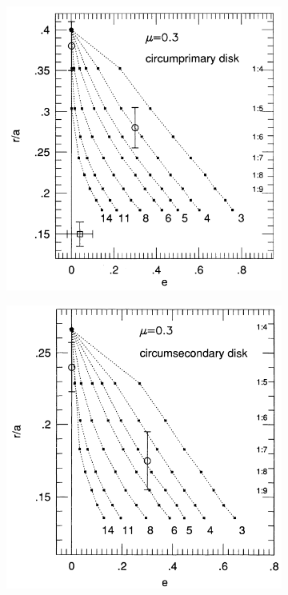 \begin{figure}[h]
    \centering
    
    \begin{subfigure}{0.48\textwidth}
        \includegraphics[width=\linewidth]{Immagini/IntroTeorica/DimPrim_Art_mu0.3.png}
    \end{subfigure}
    \hfill
    \begin{subfigure}{0.48\textwidth}
        \includegraphics[width=\linewidth]{Immagini/IntroTeorica/DimSec_Art_mu0.3.png}
    \end{subfigure}
    

\end{figure}

